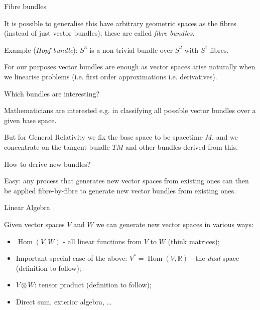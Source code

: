 \documentclass{beamer}
\DeclareMathOperator{\Hom}{Hom}
\begin{document}
\begin{frame}{Fibre bundles}

It is possible to generalise this have arbitrary geometric spaces as the fibres (instead of just vector bundles); these are called \textit{fibre bundles}.

Example (\textit{Hopf bundle}): $S^3$ is a non-trivial bundle over $S^2$ with $S^1$ fibres.

For our purposes vector bundles are enough as vector spaces arise naturally when we linearise problems (i.e. first order approximations i.e. derivatives).

\end{frame}

\begin{frame}{Which bundles are interesting?}

Mathematicians are interested e.g. in classifying all possible vector bundles over a given base space.

But for General Relativity we fix the base space to be spacetime $M$, and we concentrate on the tangent bundle $TM$ and other bundles derived from this.

\end{frame}

\begin{frame}{How to derive new bundles?}

Easy: any process that generates new vector spaces from existing ones can then be applied fibre-by-fibre to generate new vector bundles from existing ones.

\end{frame}

\begin{frame}{Linear Algebra}

Given vector spaces $V$ and $W$ we can generate new vector spaces in various ways:
\begin{itemize}
\item{$\Hom(V, W)$ - all linear functions from $V$ to $W$ (think matrices);}
\item{Important special case of the above: $V^* = \Hom(V, \mathbb{R})$ - the \textit{dual} space (definition to follow);}
\item{$V \otimes W$: tensor product (definition to follow);}
\item{Direct sum, exterior algebra, \dots}

\end{itemize}

\end{frame}
\end{document}
